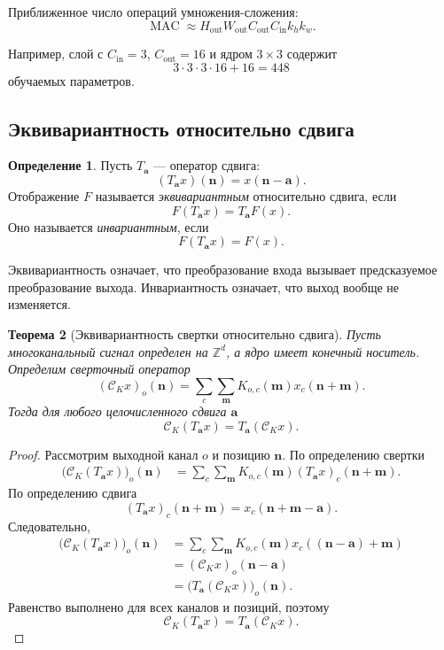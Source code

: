 \documentclass[12pt,a4paper]{article}
\numberwithin{equation}{section}
\newtheorem{theorem}{Теорема}[section]
\theoremstyle{definition}
\newtheorem{definition}[theorem]{Определение}
\theoremstyle{remark}
\begin{document}
Приближенное число операций умножения-сложения:
\[
    \operatorname{MAC}
    \approx
    H_{\mathrm{out}}W_{\mathrm{out}}
    C_{\mathrm{out}}C_{\mathrm{in}}k_hk_w.
\]

Например, слой с \(C_{\mathrm{in}}=3\), \(C_{\mathrm{out}}=16\) и
ядром \(3\times3\) содержит
\[
    3\cdot3\cdot3\cdot16+16=448
\]
обучаемых параметров.

\subsection{Эквивариантность относительно сдвига}

\begin{definition}
Пусть \(T_{\bm{a}}\) --- оператор сдвига:
\[
    (T_{\bm{a}}x)(\bm{n})
    =
    x(\bm{n}-\bm{a}).
\]
Отображение \(F\) называется \emph{эквивариантным} относительно
сдвига, если
\[
    F(T_{\bm{a}}x)
    =
    T_{\bm{a}}F(x).
\]
Оно называется \emph{инвариантным}, если
\[
    F(T_{\bm{a}}x)=F(x).
\]
\end{definition}

Эквивариантность означает, что преобразование входа вызывает
предсказуемое преобразование выхода. Инвариантность означает, что
выход вообще не изменяется.

\begin{theorem}[Эквивариантность свертки относительно сдвига]
Пусть многоканальный сигнал определен на \(\mathbb{Z}^d\), а ядро
имеет конечный носитель. Определим сверточный оператор
\[
    (\mathcal{C}_Kx)_o(\bm{n})
    =
    \sum_c\sum_{\bm{m}}
    K_{o,c}(\bm{m})x_c(\bm{n}+\bm{m}).
\]
Тогда для любого целочисленного сдвига \(\bm{a}\)
\[
    \mathcal{C}_K(T_{\bm{a}}x)
    =
    T_{\bm{a}}(\mathcal{C}_Kx).
\]
\end{theorem}

\begin{proof}
Рассмотрим выходной канал \(o\) и позицию \(\bm{n}\). По определению
свертки
\[
\begin{split}
    \bigl(\mathcal{C}_K(T_{\bm{a}}x)\bigr)_o(\bm{n})
    &=
    \sum_c\sum_{\bm{m}}
    K_{o,c}(\bm{m})
    (T_{\bm{a}}x)_c(\bm{n}+\bm{m}).
\end{split}
\]
По определению сдвига
\[
    (T_{\bm{a}}x)_c(\bm{n}+\bm{m})
    =
    x_c(\bm{n}+\bm{m}-\bm{a}).
\]
Следовательно,
\[
\begin{split}
    \bigl(\mathcal{C}_K(T_{\bm{a}}x)\bigr)_o(\bm{n})
    &=
    \sum_c\sum_{\bm{m}}
    K_{o,c}(\bm{m})
    x_c((\bm{n}-\bm{a})+\bm{m})\\
    &=
    (\mathcal{C}_Kx)_o(\bm{n}-\bm{a})\\
    &=
    \bigl(T_{\bm{a}}(\mathcal{C}_Kx)\bigr)_o(\bm{n}).
\end{split}
\]
Равенство выполнено для всех каналов и позиций, поэтому
\[
    \mathcal{C}_K(T_{\bm{a}}x)
    =
    T_{\bm{a}}(\mathcal{C}_Kx).
\]
\end{proof}
\end{document}
